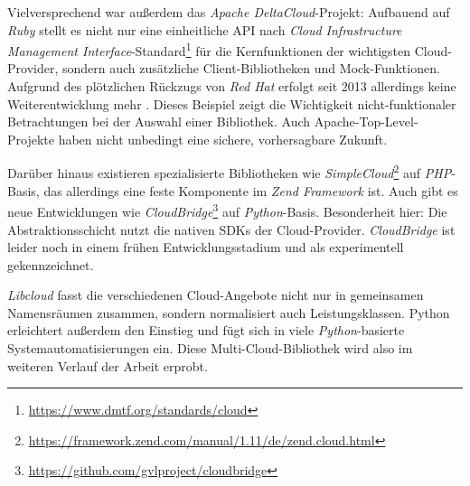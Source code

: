 \noindent Vielversprechend war außerdem das \emph{Apache DeltaCloud}-Projekt: Aufbauend auf \emph{Ruby} stellt es nicht nur eine einheitliche API nach \emph{Cloud Infrastructure Management Interface}-Standard\footnote{\url{https://www.dmtf.org/standards/cloud}} für die Kernfunktionen der wichtigsten Cloud-Provider, sondern auch zusätzliche Client-Bibliotheken und Mock-Funktionen. Aufgrund des plötzlichen Rückzugs von \emph{Red Hat} erfolgt seit 2013 allerdings keine Weiterentwicklung mehr \cite{androu:2013:deltacloud-red-hat-end}. Dieses Beispiel zeigt die Wichtigkeit nicht-funktionaler Betrachtungen bei der Auswahl einer Bibliothek. Auch Apache-Top-Level-Projekte haben nicht unbedingt eine sichere, vorhersagbare Zukunft.

Darüber hinaus existieren spezialisierte Bibliotheken wie \emph{SimpleCloud}\footnote{\url{https://framework.zend.com/manual/1.11/de/zend.cloud.html}} auf \emph{PHP}-Basis, das allerdings eine feste Komponente im \emph{Zend Framework} ist. Auch gibt es neue Entwicklungen wie \emph{CloudBridge}\footnote{\url{https://github.com/gvlproject/cloudbridge}} auf \emph{Python}-Basis. Besonderheit hier: Die Abstraktionsschicht nutzt die nativen SDKs der Cloud-Provider. \emph{CloudBridge} ist leider noch in einem frühen Entwicklungsstadium und als experimentell gekennzeichnet.

\emph{Libcloud} fasst die verschiedenen Cloud-Angebote nicht nur in gemeinsamen Namensräumen zusammen, sondern normalisiert auch Leistungsklassen. Python erleichtert außerdem den Einstieg und fügt sich in viele \emph{Python}-basierte Systemautomatisierungen ein. Diese Multi-Cloud-Bibliothek wird also im weiteren Verlauf der Arbeit erprobt.

